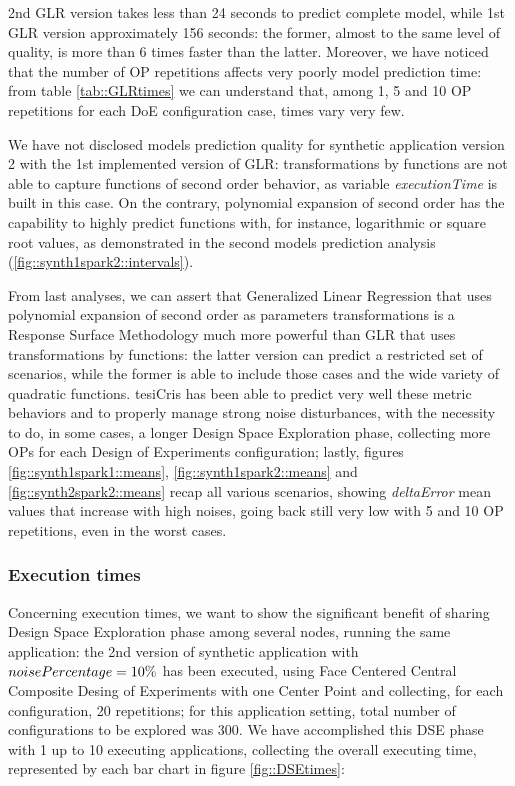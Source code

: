2nd GLR version takes less than 24 seconds to predict complete model, while 1st GLR version approximately 156 seconds: the former, almost to the same level of quality, is more than 6 times faster than the latter. Moreover, we have noticed that the number of OP repetitions affects very poorly model prediction time: from table \ref{tab::GLRtimes} we can understand that, among 1, 5 and 10 OP repetitions for each DoE configuration case, times vary very few.

We have not disclosed models prediction quality for synthetic application version 2 with the 1st implemented version of GLR: transformations by functions are not able to capture functions of second order behavior, as variable \textit{executionTime} is built in this case. On the contrary, polynomial expansion of second order has the capability to highly predict functions with, for instance, logarithmic or square root values, as demonstrated in the second models prediction analysis (\ref{fig::synth1spark2::intervals}).

From last analyses, we can assert that Generalized Linear Regression that uses polynomial expansion of second order as parameters transformations is a Response Surface Methodology much more powerful than GLR that uses transformations by functions: the latter version can predict a restricted set of scenarios, while the former is able to include those cases and the wide variety of quadratic functions. tesiCris has been able to predict very well these metric behaviors and to properly manage strong noise disturbances, with the necessity to do, in some cases, a longer Design Space Exploration phase, collecting more OPs for each Design of Experiments configuration; lastly, figures \ref{fig::synth1spark1::means}, \ref{fig::synth1spark2::means} and \ref{fig::synth2spark2::means} recap all various scenarios, showing \textit{deltaError} mean values that increase with high noises, going back still very low with 5 and 10 OP repetitions, even in the worst cases.


\subsubsection{Execution times}

Concerning execution times, we want to show the significant benefit of sharing Design Space Exploration phase among several nodes, running the same application: the 2nd version of synthetic application with $noise\-Percentage = 10\%$ has been executed, using Face Centered Central Composite Desing of Experiments with one Center Point and collecting, for each configuration, 20 repetitions; for this application setting, total number of configurations to be explored was 300. We have accomplished this DSE phase with 1 up to 10 executing applications, collecting the overall executing time, represented by each bar chart in figure \ref{fig::DSEtimes}:

